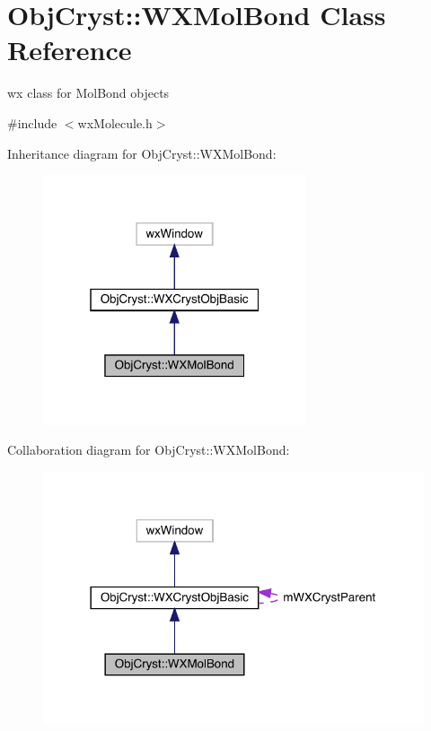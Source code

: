 \hypertarget{class_obj_cryst_1_1_w_x_mol_bond}{}\section{Obj\+Cryst\+::W\+X\+Mol\+Bond Class Reference}
\label{class_obj_cryst_1_1_w_x_mol_bond}


wx class for Mol\+Bond objects  




{\ttfamily \#include $<$wx\+Molecule.\+h$>$}



Inheritance diagram for Obj\+Cryst\+::W\+X\+Mol\+Bond\+:
\nopagebreak
\begin{figure}[H]
\begin{center}
\leavevmode
\includegraphics[width=220pt]{class_obj_cryst_1_1_w_x_mol_bond__inherit__graph}
\end{center}
\end{figure}


Collaboration diagram for Obj\+Cryst\+::W\+X\+Mol\+Bond\+:
\nopagebreak
\begin{figure}[H]
\begin{center}
\leavevmode
\includegraphics[width=318pt]{class_obj_cryst_1_1_w_x_mol_bond__coll__graph}
\end{center}
\end{figure}
